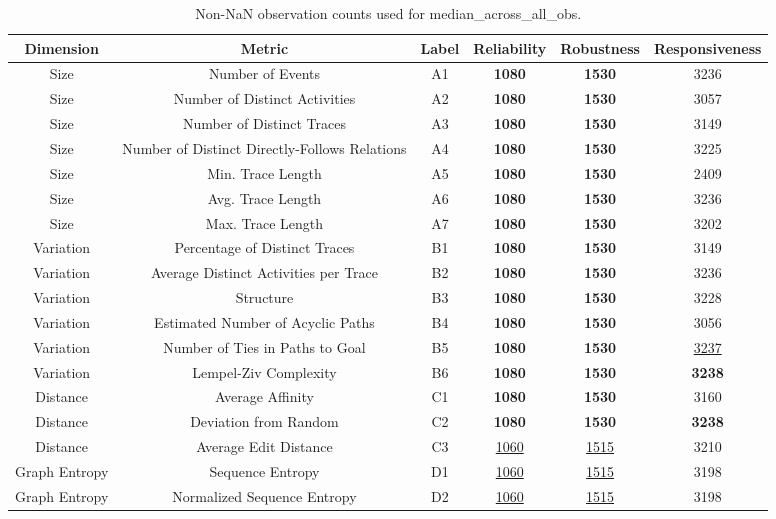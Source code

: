 \begin{table}[H]
\centering
\scriptsize
\caption{Non-NaN observation counts used for median_across_all_obs.}
\label{tab:median-across-all-obs-counts}
\setlength{\tabcolsep}{2pt}  %
\begin{tabular}{cccccc}
\toprule
    Dimension &                                        Metric & Label &  Reliability &  Robustness &  Responsiveness \\
\midrule
Size & Number of Events & A1 & \textbf{1080} & \textbf{1530} & 3236 \\
Size & Number of Distinct Activities & A2 & \textbf{1080} & \textbf{1530} & 3057 \\
Size & Number of Distinct Traces & A3 & \textbf{1080} & \textbf{1530} & 3149 \\
Size & Number of Distinct Directly-Follows Relations & A4 & \textbf{1080} & \textbf{1530} & 3225 \\
Size & Min. Trace Length & A5 & \textbf{1080} & \textbf{1530} & 2409 \\
Size & Avg. Trace Length & A6 & \textbf{1080} & \textbf{1530} & 3236 \\
Size & Max. Trace Length & A7 & \textbf{1080} & \textbf{1530} & 3202 \\
Variation & Percentage of Distinct Traces & B1 & \textbf{1080} & \textbf{1530} & 3149 \\
Variation & Average Distinct Activities per Trace & B2 & \textbf{1080} & \textbf{1530} & 3236 \\
Variation & Structure & B3 & \textbf{1080} & \textbf{1530} & 3228 \\
Variation & Estimated Number of Acyclic Paths & B4 & \textbf{1080} & \textbf{1530} & 3056 \\
Variation & Number of Ties in Paths to Goal & B5 & \textbf{1080} & \textbf{1530} & \underline{3237} \\
Variation & Lempel-Ziv Complexity & B6 & \textbf{1080} & \textbf{1530} & \textbf{3238} \\
Distance & Average Affinity & C1 & \textbf{1080} & \textbf{1530} & 3160 \\
Distance & Deviation from Random & C2 & \textbf{1080} & \textbf{1530} & \textbf{3238} \\
Distance & Average Edit Distance & C3 & \underline{1060} & \underline{1515} & 3210 \\
Graph Entropy & Sequence Entropy & D1 & \underline{1060} & \underline{1515} & 3198 \\
Graph Entropy & Normalized Sequence Entropy & D2 & \underline{1060} & \underline{1515} & 3198 \\

\end{tabular}
\end{table}
